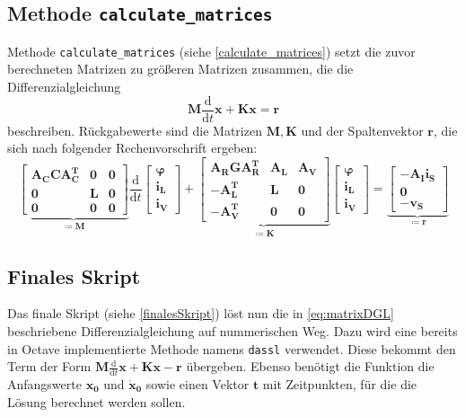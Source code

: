 \subsection*{Methode \texttt{calculate\_matrices}}
	Methode \texttt{calculate\_matrices} (siehe \ref{calculate_matrices}) setzt die zuvor berechneten Matrizen zu größeren Matrizen zusammen, die die Differenzialgleichung
	\begin{equation}
	\mathbf{M} \frac{\text{d}}{\text{d}t} \mathbf{x} + \mathbf{K} \mathbf{x} = \mathbf{r}
	\label{eq:matrixDGL}
	\end{equation}
	beschreiben. Rückgabewerte sind die Matrizen $\mathbf{M, K}$ und der Spaltenvektor $\mathbf{r}$, die sich nach folgender Rechenvorschrift ergeben:
	\begin{equation}
	\underbrace{
		\begin{bmatrix}
			\mathbf{A_C C A_C^T} & \mathbf{0} & \mathbf{0}\\
			\mathbf{0} & \mathbf{L} & \mathbf{0}\\
			\mathbf{0} & \mathbf{0} & \mathbf{0}
		\end{bmatrix}
	}_{\coloneqq \mathbf{M}}
	\frac{\text{d}}{\text{d}t}
	\begin{bmatrix}
		\boldsymbol{\varphi}\\
		\mathbf{i_L}\\
		\mathbf{i_V}
	\end{bmatrix}
	+
	\underbrace{
		\begin{bmatrix}
		\mathbf{A_R G A_R^T} & \mathbf{A_L} & \mathbf{A_V}\\
		-\mathbf{A_L^T} & \mathbf{L} & \mathbf{0}\\
		-\mathbf{A_V^T} & \mathbf{0} & \mathbf{0}
		\end{bmatrix}
	}_{\coloneqq \mathbf{K}}
	\begin{bmatrix}
	\boldsymbol{\varphi}\\
	\mathbf{i_L}\\
	\mathbf{i_V}
	\end{bmatrix}
	=
	\underbrace{
		\begin{bmatrix}
			-\mathbf{A_I i_S}\\
			\mathbf{0}\\
			-\mathbf{v_S}
		\end{bmatrix}
	}_{\coloneqq \mathbf{r}}
	\end{equation}
	\newpage

\subsection*{Finales Skript}	
	Das finale Skript (siehe \ref{finalesSkript}) löst nun die in \ref{eq:matrixDGL} beschriebene Differenzialgleichung auf nummerischen Weg. Dazu wird eine bereits in Octave implementierte Methode namens \texttt{dassl} verwendet. Diese bekommt den Term der Form $\mathbf{M} \frac{\text{d}}{\text{d}t} \mathbf{x} + \mathbf{K} \mathbf{x} - \mathbf{r}$ übergeben. Ebenso benötigt die Funktion die Anfangswerte $\mathbf{x_0}$ und $\mathbf{\dot{x}_0}$ sowie einen Vektor $\mathbf{t}$ mit Zeitpunkten, für die die Lösung berechnet werden sollen.

